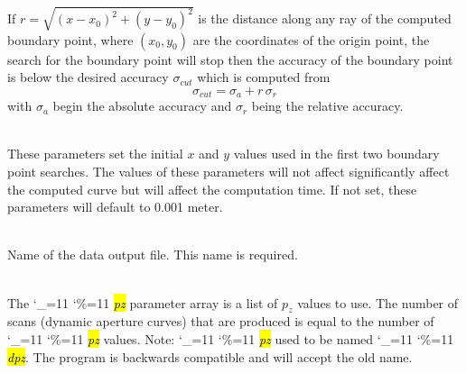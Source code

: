 \documentclass{hitec}
\newcommand\dottcmd[1]{\hl{\em#1}\endgroup}
\newcommand{\vn}{\begingroup\catcode`\_=11 \catcode`\%=11 \dottcmd}
\newcommand{\Newline}{\hfil \\}
\begin{document}
\begin{description}
{If $r = \sqrt{(x-x_0)^2 + (y-y_0)^2}$ is the distance
along any ray of the computed boundary point, where $(x_0, y_0)$ are the coordinates of the origin
point, the search for the boundary point will stop then the accuracy of the boundary point is below
the desired accuracy $\sigma_{cut}$ which is computed from
\begin{equation}
  \sigma_{cut} = \sigma_a + r \, \sigma_r
\end{equation}
with $\sigma_a$ begin the absolute accuracy and $\sigma_r$ being the relative accuracy.
%
\item[da_param\%x_init, da_param\%y_init] \Newline
These parameters set the initial $x$ and $y$ values used in the first two boundary point searches.
The values of these parameters will not affect significantly affect the computed curve but will
affect the computation time. If not set, these parameters will default to 0.001 meter.
%
\item[dat_file] \Newline
Name of the data output file. This name is required.
%
\item[pz] \Newline
The \vn{pz} parameter array is a list of $p_z$ values to use. The number of scans (dynamic aperture
curves) that are produced is equal to the number of \vn{pz} values. Note: \vn{pz} used to be named
\vn{dpz}. The program is backwards compatible and will accept the old name.

}
\end{description}
\end{document}
